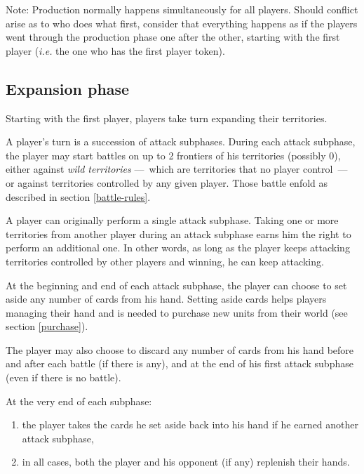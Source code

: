 \documentclass[a4paper]{article}
\begin{document}
        Note: Production normally happens simultaneously for all players.
        Should conflict arise as to who does what first,
        consider that everything happens as if the players went through
        the production phase one after the other, starting with the first player
        (\textit{i.e.} the one who has the first player token).

    \subsection{Expansion phase}
        \label{expansion}    
        Starting with the first player,
        players take turn expanding their territories.
        
        A player's turn is a succession of attack subphases.
        During each attack subphase, the player may start battles
        on up to 2 frontiers of his territories (possibly 0),
        either against \textit{wild territories}
        ---~which are territories that no player control~---
        or against territories controlled by any given player.
        Those battle enfold as described in section \ref{battle-rules}.
        
        A player can originally perform a single attack subphase.
        Taking one or more territories from another player during an attack subphase
        earns him the right to perform an additional one.
        In other words, as long as the player keeps attacking territories controlled by
        other players and winning, he can keep attacking.
        
        At the beginning and end of each attack subphase,
        the player can choose to set aside any number of cards from his hand.
        Setting aside cards helps players managing their hand
        and is needed to purchase new units from their world
        (see section \ref{purchase}).
        
        The player may also choose to discard any number of cards from his hand
        before and after each battle (if there is any), and at the end of his first
        attack subphase (even if there is no battle).
        
        At the very end of each subphase:
        \vspace{-1.3em}
        \begin{enumerate}
            \item the player takes the cards he set aside back into his hand if he earned
                     another attack subphase,
            \item in all cases, both the player and his opponent (if any)
                     replenish their hands.
        \end{enumerate}
        
\end{document}
